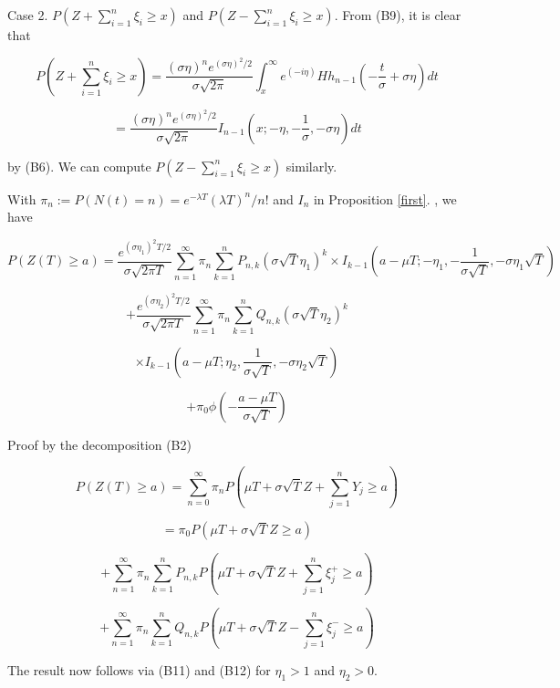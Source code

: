 Case 2. $P(Z+\sum_{i=1}^{n}\xi_{i}\geq x)$ and $P(Z-\sum_{i=1}^{n}\xi_{i}\geq x)$. From (B9), it is clear that

$$P(Z+\sum_{i=1}^{n}\xi_{i}\geq x)=\frac{(\sigma\eta)^{n}e^{(\sigma\eta)^{2}/2}}{\sigma\sqrt{2\pi}}\int_{x}^{\infty}e^{(-i\eta)}Hh_{n-1}(-\frac{t}{\sigma}+\sigma\eta)dt$$

$$=\frac{(\sigma\eta)^{n}e^{(\sigma\eta)^{2}/2}}{\sigma\sqrt{2\pi}}I_{n-1}(x;-\eta,-\frac{1}{\sigma},-\sigma\eta)dt$$

by (B6). We can compute
$P(Z-\sum_{i=1}^{n}\xi_{i}\geq x)$ similarly.

 With $\pi_{n}:= P(N(t)=n)=e^{-\lambda T}(\lambda T)^{n}/n!$ and $I_{n}$ in Proposition \ref{first}.
, we have

$$P(Z(T)\geq a)=\frac{e^{(\sigma \eta_{1})^{2} T/2}}{\sigma \sqrt{2 \pi T}} \sum_{n=1}^{\infty} \pi_{n} \sum_{k=1}^{n} P_{n,k}(\sigma\sqrt{T}\eta_{1})^{k}\times I_{k-1}(a-\mu T; -\eta_{1},-\frac{1}{\sigma\sqrt{T}},-\sigma\eta_{1}\sqrt{T})$$

$$+\frac{e^{(\sigma\eta_{2})^{2}T/2}}{\sigma\sqrt{2\pi T}}\sum_{n=1}^{\infty}\pi_{n}\sum_{k=1}^{n}Q_{n,k}(\sigma\sqrt{T}\eta_{2})^{k}$$

$$\times I_{k-1}(a-\mu T; \eta_{2},\frac{1}{\sigma\sqrt{T}},-\sigma\eta_{2}\sqrt{T})$$

$$+\pi_{0}\phi(-\frac{a-\mu T}{\sigma\sqrt{T}})$$

Proof by the decomposition (B2)

$$P(Z(T) \geq a)= \sum_{n=0}^{\infty}\pi_{n} P(\mu T +\sigma\sqrt{T} Z + \sum_{j=1}^{n}Y_{j} \geq a)$$

$$=\pi_{0}P(\mu T +\sigma\sqrt{T} Z  \geq a)$$

$$+\sum_{n=1}^{\infty}\pi_{n}\sum_{k=1}^{n}P_{n,k} P(\mu T +\sigma\sqrt{T} Z + \sum_{j=1}^{n}\xi_{j}^{+} \geq a)$$

$$+\sum_{n=1}^{\infty}\pi_{n}\sum_{k=1}^{n}Q_{n,k} P(\mu T +\sigma\sqrt{T} Z - \sum_{j=1}^{n}\xi_{j}^{-} \geq a)$$

The result now follows via (B11) and (B12) for $\eta_{1} > 1$ and $\eta_{2} >0$. 